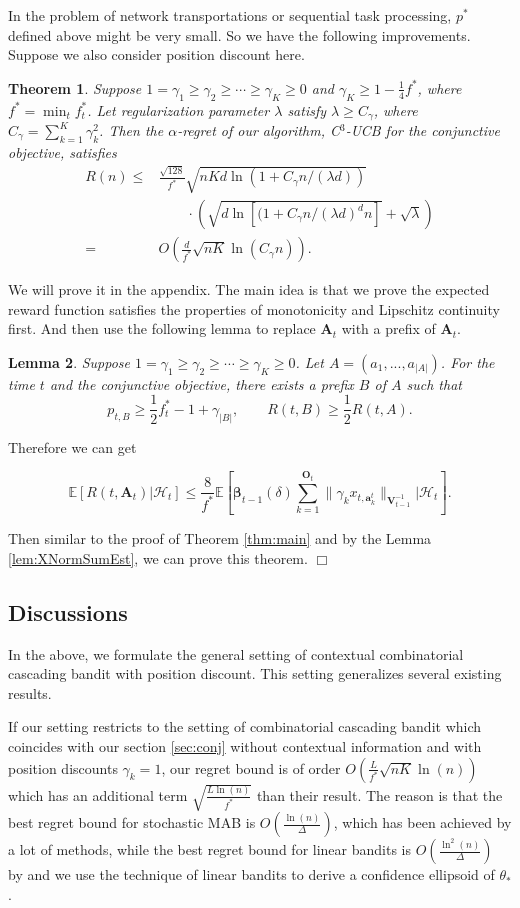 \documentclass{article}
\newcommand{\bbeta}{\boldsymbol{\beta}}
\newcommand{\EE}{\mathbb{E}}
\newcommand{\bA}{\mathbf{A}}
\newcommand{\ba}{\mathbf{a}}
\newcommand{\bO}{\mathbf{O}}
\newcommand{\bV}{\mathbf{V}}
\newcommand{\cH}{\mathcal{H}}
\newcommand{\abs}[1]{\left| #1 \right|}
\newcommand{\norm}[1]{\| #1 \|}
\newtheorem{theorem}{Theorem}[section]
\newtheorem{lemma}[theorem]{Lemma}%
\newenvironment{proof}{\noindent {\textbf{Proof. }}}{$\Box$ \medskip}
\newcommand{\CLemmaPrefixExi}{
	Suppose $1 = \gamma_1 \geq \gamma_2 \geq \cdots \geq \gamma_K \geq 0$. Let $A = (a_1, ..., a_{\abs{A}})$. For the time $t$ and the conjunctive objective, there exists a prefix $B$ of $A$ such that 
	$$
	p_{t, B} \geq \frac{1}{2}f_{t}^{\ast} - 1 + \gamma_{\abs{B}}, \qquad R(t, B) \geq \frac{1}{2} R(t, A).
	$$ 
}
\newcommand{\CEqDeltaEstAnd}{
	$$
	\EE [R(t, \bA_t) |\cH_t ] \leq \frac{8}{f^{\ast}} \EE \left[ \bbeta_{t-1}(\delta)\sum_{k=1}^{\bO_t}\norm{\gamma_k x_{t,\ba_k^t}}_{\bV_{t-1}^{-1}} | \cH_t\right].
	$$
}
\begin{document}
In the problem of network transportations or sequential task processing, $p^*$ defined above might be very small. So we have the following improvements. Suppose we also consider position discount here.  
\begin{theorem} %
	\label{thm:and}
	Suppose $1 = \gamma_1 \geq \gamma_2 \geq \cdots \geq \gamma_{K} \geq 0$ and $\gamma_K \geq 1 - \frac{1}{4} f^{\ast}$, where $f^* = \min_{t} f_t^{\ast}$. Let regularization parameter $\lambda$ satisfy $\lambda \geq C_\gamma$, where $C_\gamma = \sum_{k=1}^{K} \gamma_k^2$. Then the $\alpha$-regret of our algorithm, C$^3$-UCB for the conjunctive objective, satisfies
	\begin{align}
		R(n) \le& \frac{\sqrt{128}}{f^{\ast}} \sqrt{nKd\ln(1 + C_\gamma n/(\lambda d))} \nonumber \\
		&\qquad \cdot \left(\sqrt{d\ln[(1 + C_\gamma n/(\lambda d)^d n] } + \sqrt{\lambda}\right) \nonumber \\
		=&O\left(\frac{d}{f^{\ast}}\sqrt{nK} \ln(C_\gamma n) \right).
	\end{align}
\end{theorem}
\begin{proof}
	We will prove it in the appendix. The main idea is that we prove the expected reward function satisfies the properties of monotonicity and Lipschitz continuity first. And then use the following lemma to replace $\bA_t$ with a prefix of $\bA_t$.
	\begin{lemma}
		\CLemmaPrefixExi
	\end{lemma}
	
	Therefore we can get
	\CEqDeltaEstAnd
	
	Then similar to the proof of Theorem \ref{thm:main} and by the Lemma \ref{lem:XNormSumEst}, we can prove this theorem.
\end{proof}


\subsection{Discussions}
\label{sec:diss}

In the above, we formulate the general setting of contextual combinatorial cascading bandit with position discount. This setting generalizes several existing results. 

If our setting restricts to the setting of combinatorial cascading bandit \cite{kveton2015combinatorial} which coincides with our section \ref{sec:conj} without contextual information and with position discounts $\gamma_k = 1$, our regret bound is of order $O\left(\frac{L}{f^*}\sqrt{nK}\ln(n)\right)$ which has an additional term $\sqrt{\frac{L\ln(n)}{f^*}}$ than their result. The reason is that the best regret bound for stochastic MAB is $O(\frac{\ln(n)}{\Delta})$, which has been achieved by a lot of methods, while the best regret bound for linear bandits is $O\left(\frac{\ln^2(n)}{\Delta}\right)$ by \cite{abbasi2011improved} and we use the technique of linear bandits to derive a confidence ellipsoid of $\theta_{\ast}$.  
\end{document}
